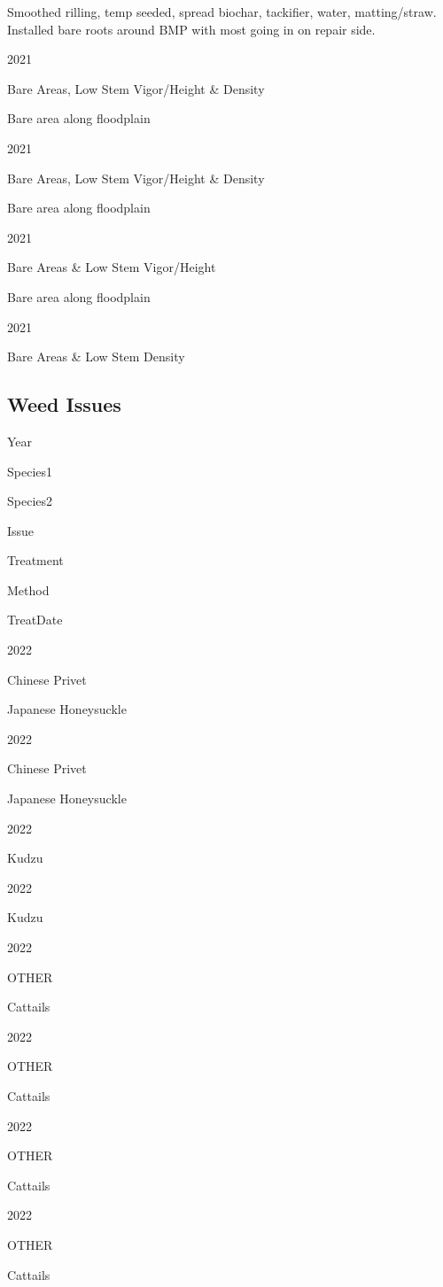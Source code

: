 \documentclass[
  landscape]{article}
\begin{document}
Smoothed rilling, temp seeded, spread biochar, tackifier, water,
matting/straw. Installed bare roots around BMP with most going in on
repair side.

2021

Bare Areas, Low Stem Vigor/Height \& Density

Bare area along floodplain

2021

Bare Areas, Low Stem Vigor/Height \& Density

Bare area along floodplain

2021

Bare Areas \& Low Stem Vigor/Height

Bare area along floodplain

2021

Bare Areas \& Low Stem Density

\hypertarget{weed-issues}{%
\subsection{Weed Issues}\label{weed-issues}}

Year

Species1

Species2

Issue

Treatment

Method

TreatDate

2022

Chinese Privet

Japanese Honeysuckle

2022

Chinese Privet

Japanese Honeysuckle

2022

Kudzu

2022

Kudzu

2022

OTHER

Cattails

2022

OTHER

Cattails

2022

OTHER

Cattails

2022

OTHER

Cattails
\end{document}
